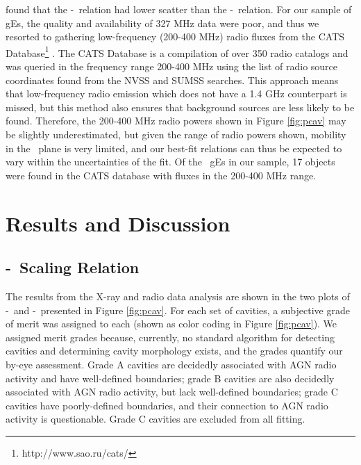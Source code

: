 \documentclass{emulateapj}
\begin{document}
\citet{birzan08} found that the \pcav-\pthree\ relation had lower
scatter than the \pcav-\phigh\ relation. For our sample of gEs, the
quality and availability of 327 MHz data were poor, and thus we
resorted to gathering low-frequency (200-400 MHz) radio fluxes from
the CATS Database\footnote{http://www.sao.ru/cats/} \citep{cats}. The
CATS Database is a compilation of over 350 radio catalogs and was
queried in the frequency range 200-400 MHz using the list of radio
source coordinates found from the NVSS and SUMSS searches. This
approach means that low-frequency radio emission which does not have a
1.4 GHz counterpart is missed, but this method also ensures that
background sources are less likely to be found. Therefore, the 200-400
MHz radio powers shown in Figure \ref{fig:pcav} may be slightly
underestimated, but given the range of radio powers shown, mobility in
the \radpow\ plane is very limited, and our best-fit relations can
thus be expected to vary within the uncertainties of the fit. Of the
\samp\ gEs in our sample, 17 objects were found in the CATS database
with fluxes in the 200-400 MHz range.


\section{Results and Discussion}
\label{sec:r&d}

\subsection{\pjet-\prad\ Scaling Relation}
\label{sec:relation}

The results from the X-ray and radio data analysis are shown in the
two plots of \pcav-\phigh\ and \pcav-\plow\ presented in Figure
\ref{fig:pcav}. For each set of cavities, a subjective grade of merit
was assigned to each (shown as color coding in Figure
\ref{fig:pcav}). We assigned merit grades because, currently, no
standard algorithm for detecting cavities and determining cavity
morphology exists, and the grades quantify our by-eye
assessment. Grade A cavities are decidedly associated with AGN radio
activity and have well-defined boundaries; grade B cavities are also
decidedly associated with AGN radio activity, but lack well-defined
boundaries; grade C cavities have poorly-defined boundaries, and their
connection to AGN radio activity is questionable. Grade C cavities are
excluded from all fitting.
\end{document}
